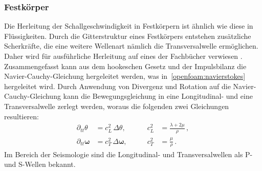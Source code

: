 \subsubsection*{Festkörper}
Die Herleitung der Schallgeschwindigkeit in Festkörpern ist ähnlich wie diese
in Flüssigkeiten. Durch die Gitterstruktur eines Festkörpers entstehen
zusätzliche Scherkräfte, die eine weitere Wellenart nämlich die
Transversalwelle ermöglichen. Daher wird für ausführliche Herleitung
auf eines der Fachbücher verwiesen \cite{schall:landaulifschitz,schall:gurtin}.
Zusammengefasst kann aus dem hookeschen Gesetz und der Impulsbilanz
die Navier-Cauchy-Gleichung hergeleitet werden, was in~\ref{openfoam:navierstokes}
hergeleitet wird.
Durch Anwendung von Divergenz und Rotation auf die Navier-Cauchy-Gleichung
kann die Bewegungsgleichung in eine Longitudinal- und eine Transversalwelle
zerlegt werden, woraus die folgenden zwei Gleichungen resultieren:
\[
\begin{aligned}
    \partial_{tt}\theta &= c_L^2\,\Delta\theta, & \qquad c_L^2 &= \frac{\lambda+2\mu}{\rho}\, ,\\
    \partial_{tt}\boldsymbol{\omega} &= c_T^2\,\Delta\boldsymbol{\omega}, & \qquad c_T^2 &= \frac{\mu}{\rho}\, .
\end{aligned}
\]
Im Bereich der Seismologie sind die Longitudinal- und Transversalwellen als
P- und S-Wellen bekannt.

